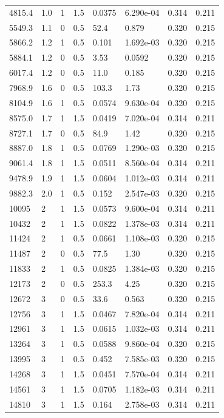 \documentclass[preview]{standalone}
\begin{document}
{{\begin{tabular}{L{1.2cm}C{1.2cm} C{0.3cm}C{0.5cm} C{1.4cm}C{1.4cm} C{1.4cm}C{1.4cm}}
  4815.4  &   1.0  & 1     & 1.5 &  0.0375  & 6.290e-04  & 0.314 &  0.211   \\ 
  5549.3  &   1.1  & 0     & 0.5 &  52.4  & 0.879  & 0.320 &  0.215   \\ 
  5866.2  &   1.2  & 1     & 0.5 &  0.101  & 1.692e-03  & 0.320 &  0.215   \\ 
  5884.1  &   1.2  & 0     & 0.5 &  3.53  & 0.0592  & 0.320 &  0.215   \\ 
  6017.4  &   1.2  & 0     & 0.5 &  11.0  & 0.185  & 0.320 &  0.215   \\ 
  7968.9  &   1.6  & 0     & 0.5 &  103.3  & 1.73  & 0.320 &  0.215   \\ 
  8104.9  &   1.6  & 1     & 0.5 &  0.0574  & 9.630e-04  & 0.320 &  0.215   \\ 
  8575.0  &   1.7  & 1     & 1.5 &  0.0419  & 7.020e-04  & 0.314 &  0.211   \\ 
  8727.1  &   1.7  & 0     & 0.5 &  84.9  & 1.42  & 0.320 &  0.215   \\ 
  8887.0  &   1.8  & 1     & 0.5 &  0.0769  & 1.290e-03  & 0.320 &  0.215   \\ 
  9061.4  &   1.8  & 1     & 1.5 &  0.0511  & 8.560e-04  & 0.314 &  0.211   \\ 
  9478.9  &   1.9  & 1     & 1.5 &  0.0604  & 1.012e-03  & 0.314 &  0.211   \\ 
  9882.3  &   2.0  & 1     & 0.5 &  0.152  & 2.547e-03  & 0.320 &  0.215   \\ 
  10095  &     2  & 1     & 1.5 &  0.0573  & 9.600e-04  & 0.314 &  0.211   \\ 
  10432  &     2  & 1     & 1.5 &  0.0822  & 1.378e-03  & 0.314 &  0.211   \\ 
  11424  &     2  & 1     & 0.5 &  0.0661  & 1.108e-03  & 0.320 &  0.215   \\ 
  11487  &     2  & 0     & 0.5 &  77.5  & 1.30  & 0.320 &  0.215   \\ 
  11833  &     2  & 1     & 0.5 &  0.0825  & 1.384e-03  & 0.320 &  0.215   \\ 
  12173  &     2  & 0     & 0.5 &  253.3  & 4.25  & 0.320 &  0.215   \\ 
  12672  &     3  & 0     & 0.5 &  33.6  & 0.563  & 0.320 &  0.215   \\ 
  12756  &     3  & 1     & 1.5 &  0.0467  & 7.820e-04  & 0.314 &  0.211   \\ 
  12961  &     3  & 1     & 1.5 &  0.0615  & 1.032e-03  & 0.314 &  0.211   \\ 
  13264  &     3  & 1     & 0.5 &  0.0588  & 9.860e-04  & 0.320 &  0.215   \\ 
  13995  &     3  & 1     & 0.5 &  0.452  & 7.585e-03  & 0.320 &  0.215   \\ 
  14268  &     3  & 1     & 1.5 &  0.0451  & 7.570e-04  & 0.314 &  0.211   \\ 
  14561  &     3  & 1     & 1.5 &  0.0705  & 1.182e-03  & 0.314 &  0.211   \\ 
  14810  &     3  & 1     & 1.5 &  0.164  & 2.758e-03  & 0.314 &  0.211   \\ 
\hline 
\end{tabular} 

}}
\end{document}
